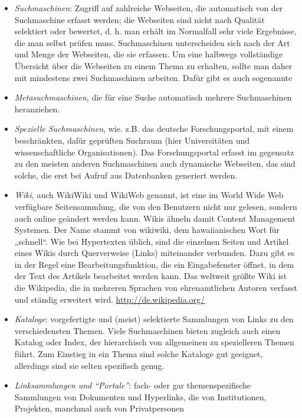 \documentclass[]{book}
\providecommand{\tightlist}{%
  \setlength{\itemsep}{0pt}\setlength{\parskip}{0pt}}
\theoremstyle{definition}
\theoremstyle{definition}
\theoremstyle{definition}
\theoremstyle{remark}
\begin{document}
\begin{itemize}
\tightlist
\item
  \emph{Suchmaschinen}: Zugriff auf zahlreiche Webseiten, die
  automatisch von der Suchmaschine erfasst werden; die Webseiten sind
  nicht nach Qualität selektiert oder bewertet, d. h. man erhält im
  Normalfall sehr viele Ergebnisse, die man selbst prüfen muss.
  Suchmaschinen unterscheiden sich nach der Art und Menge der Webseiten,
  die sie erfassen. Um eine halbwegs vollständige Übersicht über die
  Webseiten zu einem Thema zu erhalten, sollte man daher mit mindestens
  zwei Suchmaschinen arbeiten. Dafür gibt es auch sogenannte
\item
  \emph{Metasuchmaschinen}, die für eine Suche automatisch mehrere
  Suchmaschinen heranziehen.
\item
  \emph{Spezielle Suchmaschinen}, wie. z.B. das deutsche
  Forschungsportal, mit einem beschränkten, dafür geprüften Suchraum
  (hier Universitäten und wissenschaftliche Organisationen). Das
  Forschungsportal erfasst im gegensatz zu den meisten anderen
  Suchmaschinen auch dynamische Webseiten, das sind solche, die erst bei
  Aufruf aus Datenbanken generiert werden.
\item
  \emph{Wiki}, auch WikiWiki und WikiWeb genannt, ist eine im World Wide
  Web verfügbare Seitensammlung, die von den Benutzern nicht nur
  gelesen, sondern auch online geändert werden kann. Wikis ähneln damit
  Content Management Systemen. Der Name stammt von wikiwiki, dem
  hawaiianischen Wort für „schnell``. Wie bei Hypertexten üblich, sind
  die einzelnen Seiten und Artikel eines Wikis durch Querverweise
  (Links) miteinander verbunden. Dazu gibt es in der Regel eine
  Bearbeitungsfunktion, die ein Eingabefenster öffnet, in dem der Text
  des Artikels bearbeitet werden kann. Das weltweit größte Wiki ist die
  Wikipedia, die in mehreren Sprachen von ehrenamtlichen Autoren
  verfasst und ständig erweitert wird. \url{http://de.wikipedia.org/}
\item
  \emph{Kataloge}: vorgefertigte und (meist) selektierte Sammlungen von
  Links zu den verschiedensten Themen. Viele Suchmaschinen bieten
  zugleich auch einen Katalog oder Index, der hierarchisch von
  allgemeinen zu spezielleren Themen führt. Zum Einstieg in ein Thema
  sind solche Kataloge gut geeignet, allerdings sind sie selten
  spezifisch genug.
\item
  \emph{Linksammlungen und ``Portale''}: fach- oder gar
  themenspezifische Sammlungen von Dokumenten und Hyperlinks, die von
  Institutionen, Projekten, manchmal auch von Privatpersonen

\end{itemize}
\end{document}
